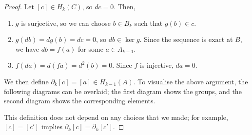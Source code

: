 \begin{proof}
	Let \( [c] \in H_k(C) \), so \( dc = 0 \).
	Then,
	\begin{enumerate}
		\item \( g \) is surjective, so we can choose \( b \in B_k \) such that \( g(b) \in c \).
		\item \( g(db) = dg(b) = dc = 0 \), so \( db \in \ker g \).
			Since the sequence is exact at \( B \), we have \( db = f(a) \) for some \( a \in A_{k-1} \).
		\item \( f(da) = d(fa) = d^2(b) = 0 \).
			Since \( f \) is injective, \( da = 0 \).
	\end{enumerate}
	We then define \( \partial_k[c] = [a] \in H_{k-1}(A) \).
	To visualise the above argument, the following diagrams can be overlaid; the first diagram shows the groups, and the second diagram shows the corresponding elements.
	\begin{center}
	\end{center}
	This definition does not depend on any choices that we made; for example, \( [c] = [c'] \) implies \( \partial_k[c] = \partial_k[c'] \).
\end{proof}
